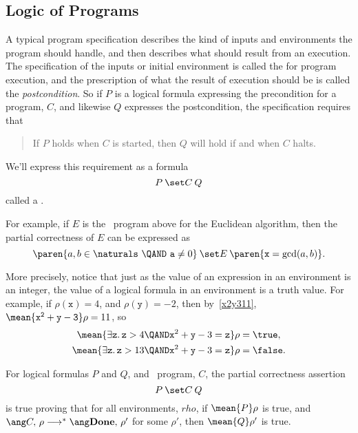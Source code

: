 \begin{problems}
\homeworkproblems
{}
\end{problems}

\subsection{Logic of Programs}

A typical program specification describes the kind of inputs and
environments the program should handle, and then describes what should
result from an execution.  The specification of the inputs or initial
environment is called the  for program execution, and
the prescription of what the result of execution should be is called the
\emph{postcondition}.  So if $P$ is a logical formula expressing the precondition
for a program, $C$, and likewise $Q$ expresses the postcondition, the
specification requires that
\begin{quote}
If $P$ holds when $C$ is started, then $Q$ will hold if and when $C$ halts.
\end{quote}
We'll express this requirement as a formula
\[
\after{P}{C}{Q}
\]
called a .

For example, if $E$ is the \while\ program above for the Euclidean
algorithm, then the partial correctness of $E$ can be expressed as
\begin{equation}\label{eucpc}
\after{\paren{a, b \in \naturals\ \QAND\  \mathtt{a} \neq 0}}{E}
                   {\paren{\mathtt{x} = \gcd(a,b)}}.
\end{equation}

More precisely, notice that just as the value of an expression in an
environment is an integer, the value of a logical formula in an
environment is a truth value.  For example, if $\rho(\mathtt{x}) =4$,
and $\rho(\mathtt{y}) =-2$, then by~\eqref{x2y311},
$\mean{\mathtt{x^2+y -3}}\rho = 11$, so
\begin{align*}
\mean{\exists \mathtt{z}.\, \mathtt{z} > 4 \QAND \mathtt{x}^2+\mathtt{y} -3=\mathtt{z}}\rho & = \true,\\
\mean{\exists \mathtt{z}.\, \mathtt{z} > 13 \QAND \mathtt{x}^2+\mathtt{y} -3=\mathtt{z}}\rho & = \false.
\end{align*}

\begin{definition}\label{def_afterPCQ}
For logical formulas $P$ and $Q$, and \while\ program, $C$, the partial correctness assertion
\[
\after{P}{C}{Q}
\]
is true proving that for all environments, $rho$, if $\mean{P}\rho$ is
true, and $\haltswith{C}{\rho}{\rho'}$ for some $\rho'$, then
$\mean{Q}\rho'$ is true.
\end{definition}

